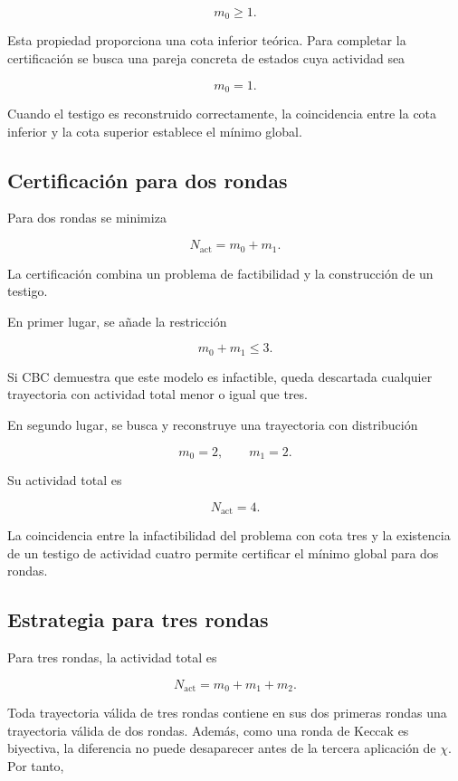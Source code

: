 \[
m_0 \geq 1.
\]

Esta propiedad proporciona una cota inferior teórica. Para completar la
certificación se busca una pareja concreta de estados cuya actividad sea

\[
m_0=1.
\]

Cuando el testigo es reconstruido correctamente, la coincidencia entre la
cota inferior y la cota superior establece el mínimo global.


\subsection{Certificación para dos rondas}
\label{subsec:certificacion_dos_rondas}

Para dos rondas se minimiza

\[
N_{\mathrm{act}}
=
m_0+m_1.
\]

La certificación combina un problema de factibilidad y la construcción de
un testigo.

En primer lugar, se añade la restricción

\[
m_0+m_1 \leq 3.
\]

Si CBC demuestra que este modelo es infactible, queda descartada cualquier
trayectoria con actividad total menor o igual que tres.

En segundo lugar, se busca y reconstruye una trayectoria con distribución

\[
m_0=2,
\qquad
m_1=2.
\]

Su actividad total es

\[
N_{\mathrm{act}}=4.
\]

La coincidencia entre la infactibilidad del problema con cota tres y la
existencia de un testigo de actividad cuatro permite certificar el mínimo
global para dos rondas.


\subsection{Estrategia para tres rondas}
\label{subsec:estrategia_tres_rondas}

Para tres rondas, la actividad total es

\[
N_{\mathrm{act}}
=
m_0+m_1+m_2.
\]

Toda trayectoria válida de tres rondas contiene en sus dos primeras rondas
una trayectoria válida de dos rondas. Además, como una ronda de Keccak es
biyectiva, la diferencia no puede desaparecer antes de la tercera
aplicación de $\chi$. Por tanto,


